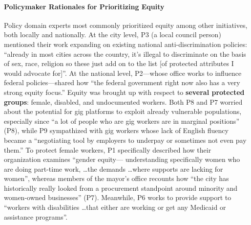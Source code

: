 \paragraph{Policymaker Rationales for Prioritizing Equity}{Policy domain experts }most commonly prioritized equity among other initiatives, both locally and nationally. At the city level, {P3 (a local council person)} mentioned their work {expanding} on existing national anti-discrimination policies: ``already in most cities across the country, it's illegal to discriminate on the basis of sex, race, religion  so these  just add on to the list {[of protected attributes I would advocate for]}''. At the national level, P2---whose office works to influence federal policies---{shared} how ``the federal government right now also has a very strong equity focus.'' Equity was brought up with respect to \textbf{several protected groups}{:} female, disabled, {and undocumented} workers. 
{Both P8 and P7 worried about the potential for gig platforms to exploit already vulnerable populations}, especially since ``a lot of people who are gig workers are in marginal positions'' (P8), {while P9 sympathized with gig workers whose lack of English fluency became a ``negotiating tool by employers to underpay or sometimes not even pay them.''}
{To protect female workers,} P1 specifically described how their organization examines ``gender equity--- understanding specifically women who are doing part-time work,  \dots the demands \dots where supports are lacking for women'', whereas
members of the mayor's office recounts how ``the city has historically really looked from a procurement standpoint around minority and women-owned businesses'' (P7). 
Meanwhile, P6 works to provide support to ``workers with disabilities  \dots  that either are working or get any Medicaid or assistance programs''. 

 



